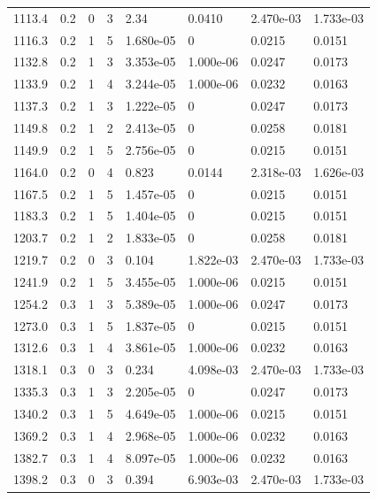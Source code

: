 \documentclass[preview]{standalone}
\begin{document}
{{{\begin{tabular}{L{1.2cm}C{1.2cm} C{0.3cm}C{0.5cm} C{1.4cm}C{1.4cm} C{1.4cm}C{1.4cm}}
  1113.4  &   0.2  & 0     &  3 &  2.34  & 0.0410  & 2.470e-03 &  1.733e-03   \\ 
  1116.3  &   0.2  & 1     &  5 &  1.680e-05  & 0  & 0.0215 &  0.0151   \\ 
  1132.8  &   0.2  & 1     &  3 &  3.353e-05  & 1.000e-06  & 0.0247 &  0.0173   \\ 
  1133.9  &   0.2  & 1     &  4 &  3.244e-05  & 1.000e-06  & 0.0232 &  0.0163   \\ 
  1137.3  &   0.2  & 1     &  3 &  1.222e-05  & 0  & 0.0247 &  0.0173   \\ 
  1149.8  &   0.2  & 1     &  2 &  2.413e-05  & 0  & 0.0258 &  0.0181   \\ 
  1149.9  &   0.2  & 1     &  5 &  2.756e-05  & 0  & 0.0215 &  0.0151   \\ 
  1164.0  &   0.2  & 0     &  4 &  0.823  & 0.0144  & 2.318e-03 &  1.626e-03   \\ 
  1167.5  &   0.2  & 1     &  5 &  1.457e-05  & 0  & 0.0215 &  0.0151   \\ 
  1183.3  &   0.2  & 1     &  5 &  1.404e-05  & 0  & 0.0215 &  0.0151   \\ 
  1203.7  &   0.2  & 1     &  2 &  1.833e-05  & 0  & 0.0258 &  0.0181   \\ 
  1219.7  &   0.2  & 0     &  3 &  0.104  & 1.822e-03  & 2.470e-03 &  1.733e-03   \\ 
  1241.9  &   0.2  & 1     &  5 &  3.455e-05  & 1.000e-06  & 0.0215 &  0.0151   \\ 
  1254.2  &   0.3  & 1     &  3 &  5.389e-05  & 1.000e-06  & 0.0247 &  0.0173   \\ 
  1273.0  &   0.3  & 1     &  5 &  1.837e-05  & 0  & 0.0215 &  0.0151   \\ 
  1312.6  &   0.3  & 1     &  4 &  3.861e-05  & 1.000e-06  & 0.0232 &  0.0163   \\ 
  1318.1  &   0.3  & 0     &  3 &  0.234  & 4.098e-03  & 2.470e-03 &  1.733e-03   \\ 
  1335.3  &   0.3  & 1     &  3 &  2.205e-05  & 0  & 0.0247 &  0.0173   \\ 
  1340.2  &   0.3  & 1     &  5 &  4.649e-05  & 1.000e-06  & 0.0215 &  0.0151   \\ 
  1369.2  &   0.3  & 1     &  4 &  2.968e-05  & 1.000e-06  & 0.0232 &  0.0163   \\ 
  1382.7  &   0.3  & 1     &  4 &  8.097e-05  & 1.000e-06  & 0.0232 &  0.0163   \\ 
  1398.2  &   0.3  & 0     &  3 &  0.394  & 6.903e-03  & 2.470e-03 &  1.733e-03   \\ 

\end{tabular}}}}
\end{document}
